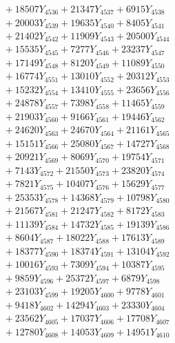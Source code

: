 \documentclass[a4paper,10pt]{article}
\begin{document}
{\begin{align}
&\;  + 18507 Y_{4536} + 21347 Y_{4537} + 6915 Y_{4538} \\[0.3ex]
&\;  + 20003 Y_{4539} + 19635 Y_{4540} + 8405 Y_{4541} \\[0.3ex]
&\;  + 21402 Y_{4542} + 11909 Y_{4543} + 20500 Y_{4544} \\[0.3ex]
&\;  + 15535 Y_{4545} + 7277 Y_{4546} + 23237 Y_{4547} \\[0.3ex]
&\;  + 17149 Y_{4548} + 8120 Y_{4549} + 11089 Y_{4550} \\[0.3ex]
&\;  + 16774 Y_{4551} + 13010 Y_{4552} + 20312 Y_{4553} \\[0.3ex]
&\;  + 15232 Y_{4554} + 13410 Y_{4555} + 23656 Y_{4556} \\[0.3ex]
&\;  + 24878 Y_{4557} + 7398 Y_{4558} + 11465 Y_{4559} \\[0.5ex]\allowbreak
&\;  + 21903 Y_{4560} + 9166 Y_{4561} + 19446 Y_{4562} \\[0.3ex]
&\;  + 24620 Y_{4563} + 24670 Y_{4564} + 21161 Y_{4565} \\[0.3ex]
&\;  + 15151 Y_{4566} + 25080 Y_{4567} + 14727 Y_{4568} \\[0.3ex]
&\;  + 20921 Y_{4569} + 8069 Y_{4570} + 19754 Y_{4571} \\[0.3ex]
&\;  + 7143 Y_{4572} + 21550 Y_{4573} + 23820 Y_{4574} \\[0.3ex]
&\;  + 7821 Y_{4575} + 10407 Y_{4576} + 15629 Y_{4577} \\[0.3ex]
&\;  + 25353 Y_{4578} + 14368 Y_{4579} + 10798 Y_{4580} \\[0.3ex]
&\;  + 21567 Y_{4581} + 21247 Y_{4582} + 8172 Y_{4583} \\[0.3ex]
&\;  + 11139 Y_{4584} + 14732 Y_{4585} + 19139 Y_{4586} \\[0.3ex]
&\;  + 8604 Y_{4587} + 18022 Y_{4588} + 17613 Y_{4589} \\[0.5ex]\allowbreak
&\;  + 18377 Y_{4590} + 18374 Y_{4591} + 13104 Y_{4592} \\[0.3ex]
&\;  + 10016 Y_{4593} + 7309 Y_{4594} + 10387 Y_{4595} \\[0.3ex]
&\;  + 9859 Y_{4596} + 25372 Y_{4597} + 6879 Y_{4598} \\[0.3ex]
&\;  + 23103 Y_{4599} + 19205 Y_{4600} + 9778 Y_{4601} \\[0.3ex]
&\;  + 9418 Y_{4602} + 14294 Y_{4603} + 23330 Y_{4604} \\[0.3ex]
&\;  + 23562 Y_{4605} + 17037 Y_{4606} + 17708 Y_{4607} \\[0.3ex]
&\;  + 12780 Y_{4608} + 14053 Y_{4609} + 14951 Y_{4610} \\[0.3ex]

\end{align}}
\end{document}

